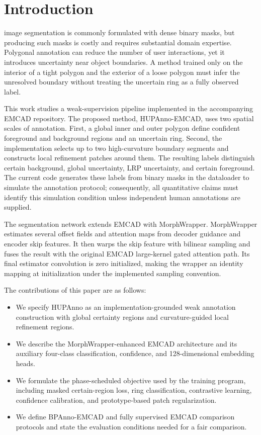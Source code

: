 \documentclass[journal]{IEEEtran}
\begin{document}
\section{Introduction}
 image segmentation is commonly formulated with dense binary masks, but producing such masks is costly and requires substantial domain expertise. Polygonal annotation can reduce the number of user interactions, yet it introduces uncertainty near object boundaries. A method trained only on the interior of a tight polygon and the exterior of a loose polygon must infer the unresolved boundary without treating the uncertain ring as a fully observed label.

This work studies a weak-supervision pipeline implemented in the accompanying EMCAD repository. The proposed method, HUPAnno-EMCAD, uses two spatial scales of annotation. First, a global inner and outer polygon define confident foreground and background regions and an uncertain ring. Second, the implementation selects up to two high-curvature boundary segments and constructs local refinement patches around them. The resulting labels distinguish certain background, global uncertainty, LRP uncertainty, and certain foreground. The current code generates these labels from binary masks in the dataloader to simulate the annotation protocol; consequently, all quantitative claims must identify this simulation condition unless independent human annotations are supplied.

The segmentation network extends EMCAD with MorphWrapper. MorphWrapper estimates several offset fields and attention maps from decoder guidance and encoder skip features. It then warps the skip feature with bilinear sampling and fuses the result with the original EMCAD large-kernel gated attention path. Its final estimator convolution is zero initialized, making the wrapper an identity mapping at initialization under the implemented sampling convention.

The contributions of this paper are as follows:
\begin{itemize}
    \item We specify HUPAnno as an implementation-grounded weak annotation construction with global certainty regions and curvature-guided local refinement regions.
    \item We describe the MorphWrapper-enhanced EMCAD architecture and its auxiliary four-class classification, confidence, and 128-dimensional embedding heads.
    \item We formulate the phase-scheduled objective used by the training program, including masked certain-region loss, ring classification, contrastive learning, confidence calibration, and prototype-based patch regularization.
    \item We define BPAnno-EMCAD and fully supervised EMCAD comparison protocols and state the evaluation conditions needed for a fair comparison.
\end{itemize}
\end{document}
